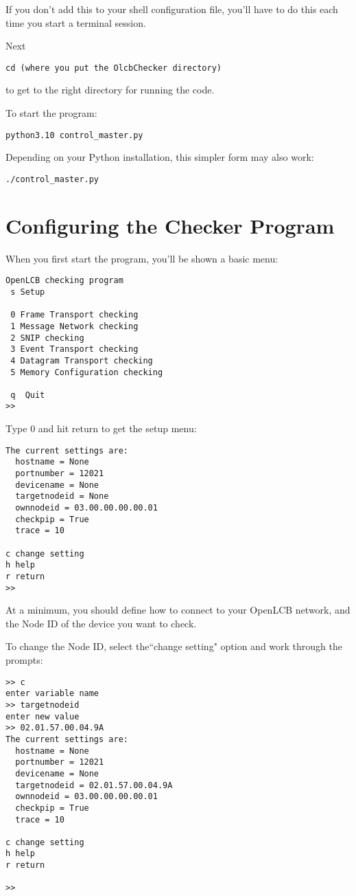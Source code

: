 \documentclass[11pt]{article}
\begin{document}
If you don't add this to your shell configuration file, you'll have to do 
this each time you start a terminal session.

Next
\begin{verbatim}
cd (where you put the OlcbChecker directory)
\end{verbatim}
to get to the right directory for running the code. 

To start the program:
\begin{verbatim}
python3.10 control_master.py
\end{verbatim}

Depending on your Python installation, this simpler form may also work:
\begin{verbatim}
./control_master.py
\end{verbatim}


\section{Configuring the Checker Program}

When you first start the program, you'll be shown a basic menu:

\begin{verbatim}
OpenLCB checking program
 s Setup

 0 Frame Transport checking
 1 Message Network checking
 2 SNIP checking
 3 Event Transport checking
 4 Datagram Transport checking
 5 Memory Configuration checking
  
 q  Quit
>> 
\end{verbatim}

Type 0 and hit return to get the setup menu:

\begin{verbatim}
The current settings are:
  hostname = None
  portnumber = 12021
  devicename = None
  targetnodeid = None
  ownnodeid = 03.00.00.00.00.01
  checkpip = True
  trace = 10

c change setting
h help
r return
>> 
\end{verbatim}

At a minimum, you should define how to connect to your OpenLCB network,
and the Node ID of the device you want to check.  

To change the Node ID, select the``change setting" option and work through the prompts:

\begin{verbatim}
>> c
enter variable name
>> targetnodeid
enter new value
>> 02.01.57.00.04.9A
The current settings are:
  hostname = None
  portnumber = 12021
  devicename = None
  targetnodeid = 02.01.57.00.04.9A
  ownnodeid = 03.00.00.00.00.01
  checkpip = True
  trace = 10

c change setting
h help
r return

>> 
\end{verbatim}
\end{document}
